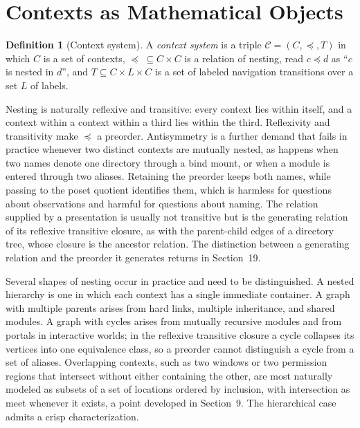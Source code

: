 \documentclass[11pt]{article}
\theoremstyle{definition}
\newtheorem{definition}[theorem]{Definition}
\theoremstyle{remark}
\newcommand{\cC}{\mathcal C}
\begin{document}
\section{Contexts as Mathematical Objects}

\begin{definition}[Context system]\label{def:ctxsys}
A \emph{context system} is a triple $\cC=(C,\preceq,T)$ in which $C$ is a set of contexts, $\preceq\;\subseteq C\times C$ is a relation of nesting, read $c\preceq d$ as ``$c$ is nested in $d$'', and $T\subseteq C\times L\times C$ is a set of labeled navigation transitions over a set $L$ of labels.
\end{definition}

Nesting is naturally reflexive and transitive: every context lies within itself, and a context within a context within a third lies within the third. Reflexivity and transitivity make $\preceq$ a preorder. Antisymmetry is a further demand that fails in practice whenever two distinct contexts are mutually nested, as happens when two names denote one directory through a bind mount, or when a module is entered through two aliases. Retaining the preorder keeps both names, while passing to the poset quotient identifies them, which is harmless for questions about observations and harmful for questions about naming. The relation supplied by a presentation is usually not transitive but is the generating relation of its reflexive transitive closure, as with the parent-child edges of a directory tree, whose closure is the ancestor relation. The distinction between a generating relation and the preorder it generates returns in Section~19.

Several shapes of nesting occur in practice and need to be distinguished. A nested hierarchy is one in which each context has a single immediate container. A graph with multiple parents arises from hard links, multiple inheritance, and shared modules. A graph with cycles arises from mutually recursive modules and from portals in interactive worlds; in the reflexive transitive closure a cycle collapses its vertices into one equivalence class, so a preorder cannot distinguish a cycle from a set of aliases. Overlapping contexts, such as two windows or two permission regions that intersect without either containing the other, are most naturally modeled as subsets of a set of locations ordered by inclusion, with intersection as meet whenever it exists, a point developed in Section~9. The hierarchical case admits a crisp characterization.
\end{document}
